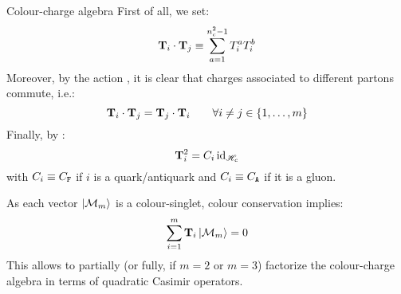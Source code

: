 \begin{observation}{Colour-charge algebra}{}
  First of all, we set:
  \begin{equation}
    \mathbf{T}_i \cdot \mathbf{T}_j \equiv \sum_{a = 1}^{n_c^2 - 1} T_i^a T_i^b
    \label{eq:t-dot}
  \end{equation}
  Moreover, by the action , it is clear that charges associated to different partons commute, i.e.:
  \begin{equation}
    \mathbf{T}_i \cdot \mathbf{T}_j = \mathbf{T}_j \cdot \mathbf{T}_i
    \qquad
    \forall i \neq j \in \{1, \dots, m\}
  \end{equation}
  Finally, by :
  \begin{equation}
    \mathbf{T}_i^2 = C_i \operatorname{id}_{\mathscr{H}_c}
  \end{equation}
  with $ C_i \equiv C_\mathtt{F} $ if $ i $ is a quark/antiquark and $ C_i \equiv C_\mathtt{A} $ if it is a gluon.
\end{observation}

As each vector $ \ket{\mathcal{M}_m} $ is a colour-singlet, colour conservation implies:
\begin{equation}
  \sum_{i = 1}^{m} \mathbf{T}_i \ket{\mathcal{M}_m} = 0
\end{equation}
This allows to partially (or fully, if $ m = 2 $ or $ m = 3 $) factorize the colour-charge algebra in terms of quadratic Casimir operators.










